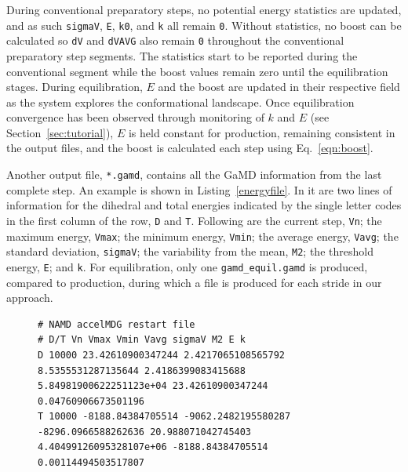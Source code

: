 \documentclass[9pt,tutorial,pubversion]{livecoms}
\begin{document}
During conventional preparatory steps, no potential energy statistics are updated, and as such \texttt{sigmaV}, \texttt{E}, \texttt{k0}, and \texttt{k} all remain \texttt{0}. Without statistics, no boost can be calculated so \texttt{dV} and \texttt{dVAVG} also remain \texttt{0} throughout the conventional preparatory step segments. The statistics start to be reported during the conventional segment while the boost values remain zero until the equilibration stages. During equilibration, $E$ and the boost are updated in their respective field as the system explores the conformational landscape. Once equilibration convergence has been observed through monitoring of $k$ and $E$ (see Section~\ref{sec:tutorial}), $E$ is held constant for production, remaining consistent in the output files, and the boost is calculated each step using Eq.~\ref{eqn:boost}. 

Another output file, \texttt{*.gamd}, contains all the GaMD information from the last complete step. An example is shown in Listing~\ref{energyfile}. In it are two lines of information for the dihedral and total energies indicated by the single letter codes in the first column of the row, \texttt{D} and \texttt{T}. Following are the current step, \texttt{Vn}; the maximum energy, \texttt{Vmax}; the minimum energy, \texttt{Vmin}; the average energy, \texttt{Vavg}; the standard deviation, \texttt{sigmaV}; the variability from the mean, \texttt{M2}; the threshold energy, \texttt{E}; and \texttt{k}. For equilibration, only one \texttt{gamd\_equil.gamd} is produced, compared to production, during which a file is produced for each stride in our approach. 

\begin{figure}
\begin{lstlisting}[label=energyfile,caption= Example of *.gamd file, basicstyle=\small,breaklines=true, backgroundcolor=\color{light-gray}]
# NAMD accelMDG restart file
# D/T Vn Vmax Vmin Vavg sigmaV M2 E k
D 10000 23.42610900347244 2.4217065108565792 8.5355531287135644 2.4186399083415688 5.84981900622251123e+04 23.42610900347244 0.04760906673501196
T 10000 -8188.84384705514 -9062.2482195580287 -8296.0966588262636 20.988071042745403 4.40499126095328107e+06 -8188.84384705514 0.00114494503517807             
\end{lstlisting}
\end{figure}
\end{document}

